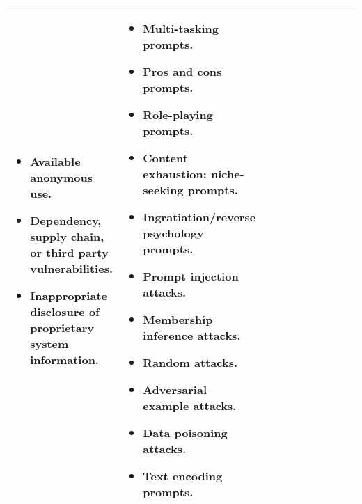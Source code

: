 \documentclass[fleqn]{article}
\begin{document}
\begin{table}[H]
\begin{tabular}{|m{0.25\linewidth} |m{0.40\linewidth} | m{0.35\linewidth} |}
\begin{itemize}[noitemsep, leftmargin=*]
			\item Available anonymous use.
			\item Dependency, supply chain, or third party vulnerabilities.
			\item Inappropriate disclosure of proprietary system information. 
		\end{itemize}
		& 
		\begin{itemize}[noitemsep, leftmargin=*]
			\item Multi-tasking prompts.
			\item Pros and cons prompts.
			\item Role-playing prompts.
			\item Content exhaustion: niche-seeking prompts.
			\item Ingratiation/reverse psychology prompts.
			\item Prompt injection attacks.
			\item Membership inference attacks.
			\item Random attacks.
			\item Adversarial example attacks.
			\item Data poisoning attacks.
			\item Text encoding prompts. 
		\end{itemize} \\
		\hline
	\end{tabular}
\end{table}

\pagebreak 
\end{document}
